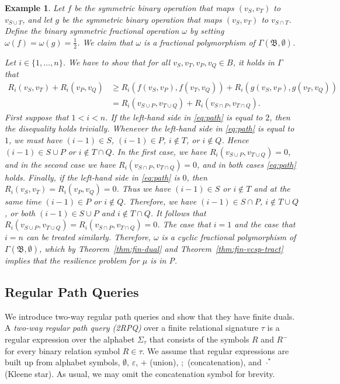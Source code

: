 \documentclass[nonacm]{acmart}
\newcommand{\bB}{{\mathfrak B}}
\newtheorem{expl}[theorem]{Example}
\begin{document}
\begin{expl}
Let $f$ be the symmetric binary operation that maps $(v_S,v_T)$ to $v_{S \cup T}$, and let $g$ be the symmetric binary operation that maps
$(v_S,v_T)$ to $v_{S \cap T}$. 
Define the binary symmetric fractional operation $\omega$ by setting 
$\omega(f)=\omega(g)=\frac{1}{2}$.
We claim that $\omega$ is a fractional polymorphism of $\Gamma(\bB, \emptyset)$. 

Let $i \in \{1,\dots,n\}$. 
We have to show that for all $v_S,v_T,v_P,v_Q \in B$, it holds in $\Gamma$ that
\begin{align} R_i(v_S,v_T)+R_i(v_P,v_Q) & \geq R_i(f(v_S,v_P),f(v_T,v_Q)) + R_i(g(v_S,v_P),g(v_T,v_Q)) \label{eq:path}  \\
& = R_i(v_{S \cup P},v_{T \cup Q}) + R_i(v_{S \cap P},v_{T \cap Q}) \nonumber. 
\end{align}
%
First suppose that $1<i<n$.
If the left-hand side in \eqref{eq:path} is equal to $2$, then the disequality holds trivially.
Whenever the left-hand side in \eqref{eq:path} is equal to $1$, we must have $(i-1) \in S$, $(i-1) \in P$, $i \notin T$, or $i \notin Q$. Hence $(i-1) \in S \cup P$  or $i \notin T \cap Q$. In the first case, we have $R_i(v_{S \cup P},v_{T \cup Q}) = 0$, and in the second case we have $R_i(v_{S \cap P},v_{T \cap Q}) = 0$, and in both cases \eqref{eq:path} holds.
Finally, if the left-hand side in \eqref{eq:path} is $0$, then $R_i(v_S, v_T)=R_i(v_P, v_Q)=0$. Thus we have $(i-1) \in S$ or $i \notin T$ and at the same time $(i-1) \in P$ or $i \notin Q$. Therefore, we have $(i-1) \in S \cap P$, $i \notin T \cup Q$, or both $(i-1) \in S \cup P$ and $i \notin T \cap Q$. It follows that $R_i(v_{S \cup P},v_{T \cup Q})=R_i(v_{S \cap P},v_{T \cap Q})=0$.
The case that $ i = 1$ and the case that $i = n$ can be treated similarly.
%
Therefore, $\omega$ is a cyclic fractional polymorphism of $\Gamma(\bB, \emptyset)$, which by Theorem~\ref{thm:fin-dual} and Theorem~\ref{thm:fin-vcsp-tract} implies that the resilience problem for $\mu$ is in P.
\end{expl}


\subsection{Regular Path Queries}
\label{sect:rpqs}

We introduce two-way regular path queries
and show that they have finite duals. A \emph{two-way regular path query (2RPQ)} over a finite relational signature $\tau$ is a
regular expression over the alphabet $\Sigma_{\tau}$ that consists of
the
symbols $R$ and $R^-$ for every binary relation symbol
$R \in \tau$.  We assume that regular expressions are built up
from alphabet symbols, $\emptyset$, $\varepsilon$, $+$ (union), $;$
(concatenation), and $\cdot^*$ (Kleene star). As usual, we may omit
the concatenation symbol for brevity.
\end{document}
